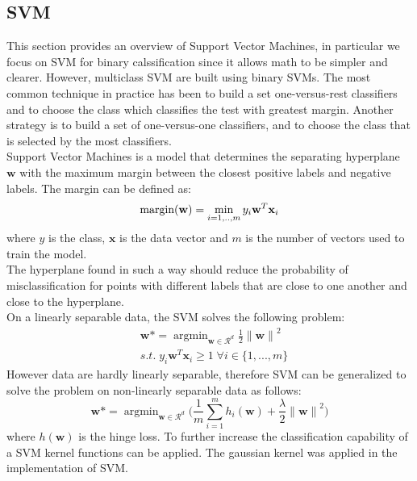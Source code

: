 \documentclass{article}
\DeclareMathOperator*{\argmin}{argmin}
\begin{document}
\subsection{SVM}
This section provides an overview of Support Vector Machines, in particular we focus on SVM for binary calssification since it allows math to be simpler and clearer. However, multiclass SVM are built using binary SVMs. The most common technique in practice has been to build  a set one-versus-rest classifiers and to choose the class which classifies the test with greatest margin. Another strategy is to build a set of one-versus-one classifiers, and to choose the class that is selected by the most classifiers. \cite{svm}
\\
Support Vector Machines is a model that determines the separating hyperplane $\textbf{w}$ with the maximum margin between the closest positive labels and negative labels. The margin can be defined as:
\begin{equation}
\text{margin(\textbf{w})} = \min_{i=1,..,m} y_i\textbf{w}^T\textbf{x}_i
\end{equation}
where $y$ is the class, $\textbf{x}$ is the data vector and $m$ is the number of vectors used to train the model. \\
The hyperplane found in such a way should reduce the probability of misclassification for points with different labels that are close to one another and close to the hyperplane. \\
On a linearly separable data, the SVM solves the following problem:
\begin{equation}
\begin{split}
   &   \textbf{w} \mbox{*} = \argmin_{\textbf{w} \in \mathcal{R}^d} \frac{1}{2} {\lVert \textbf{w} \rVert}^2 \\
   & s.t.\; y_i\textbf{w}^{T}\textbf{x}_i \geq 1 \; \forall i \in \{1, ...,m\} 
\end{split}
\end{equation}
However data are hardly linearly separable, therefore SVM can be generalized to solve the problem on non-linearly separable data as follows:
\begin{equation}
      \textbf{w} \mbox{*} = \argmin_{\textbf{w} \in \mathcal{R}^d} \bigg( \frac{1}{m}\sum_{i=1}^m h_i(\textbf{w}) + \frac{\lambda}{2} {\lVert \textbf{w} \rVert}^2 \bigg)
\end{equation}
where $h(\textbf{w})$ is the hinge loss.
To further increase the classification capability of a SVM kernel functions can be applied. The gaussian kernel was applied in the implementation of SVM.
\end{document}
